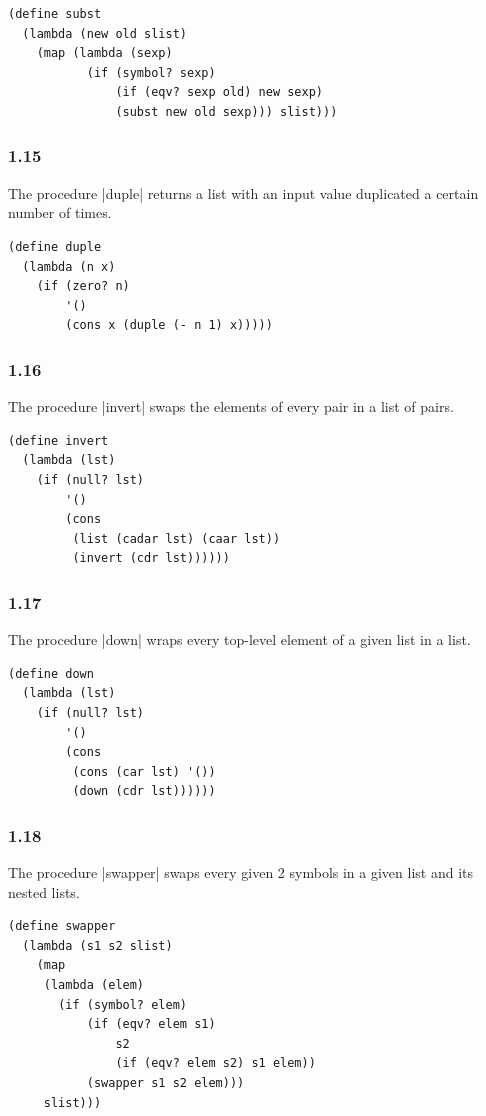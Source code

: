 \documentclass[a4paper]{article}
\begin{document}
\begin{lstlisting}
(define subst
  (lambda (new old slist)
    (map (lambda (sexp)
           (if (symbol? sexp)
               (if (eqv? sexp old) new sexp)
               (subst new old sexp))) slist)))
\end{lstlisting}

\subsubsection*{1.15}

The procedure |duple| returns a list with an input value duplicated a certain number of times.

\begin{lstlisting}
(define duple
  (lambda (n x)
    (if (zero? n)
        '()
        (cons x (duple (- n 1) x)))))
\end{lstlisting}

\subsubsection*{1.16}

The procedure |invert| swaps the elements of every pair in a list of pairs.

\begin{lstlisting}
(define invert
  (lambda (lst)
    (if (null? lst)
        '()
        (cons
         (list (cadar lst) (caar lst))
         (invert (cdr lst))))))
\end{lstlisting}

\subsubsection*{1.17}

The procedure |down| wraps every top-level element of a given list in a list.

\begin{lstlisting}
(define down
  (lambda (lst)
    (if (null? lst)
        '()
        (cons
         (cons (car lst) '())
         (down (cdr lst))))))
\end{lstlisting}

\subsubsection*{1.18}

The procedure |swapper| swaps every given 2 symbols in a given list and its nested lists.

\begin{lstlisting}
(define swapper
  (lambda (s1 s2 slist)
    (map
     (lambda (elem)
       (if (symbol? elem)
           (if (eqv? elem s1)
               s2
               (if (eqv? elem s2) s1 elem))
           (swapper s1 s2 elem)))
     slist)))
\end{lstlisting}
\end{document}
